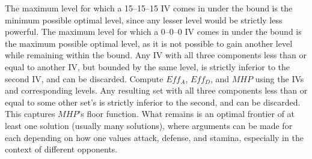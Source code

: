 The maximum level for which a 15--15--15 IV comes in under the bound is the
 minimum possible optimal level, since any lesser level would be strictly less
 powerful.
The maximum level for which a 0--0--0 IV comes in under the bound is the
 maximum possible optimal level, as it is not possible to gain another level
 while remaining within the bound.
Any IV with all three components less than or equal to another IV, but bounded
 by the same level, is strictly inferior to the second IV, and can be discarded.
Compute $Eff_A$, $Eff_D$, and $MHP$ using the IVs and corresponding levels.
Any resulting set with all three components less than or equal to some other set's
 is strictly inferior to the second, and can be discarded.
This captures $MHP$'s floor function.
What remains is an optimal frontier of at least one solution (usually
 many solutions), where arguments can be made for each depending on how one
 values attack, defense, and stamina, especially in the context of different
 opponents.

